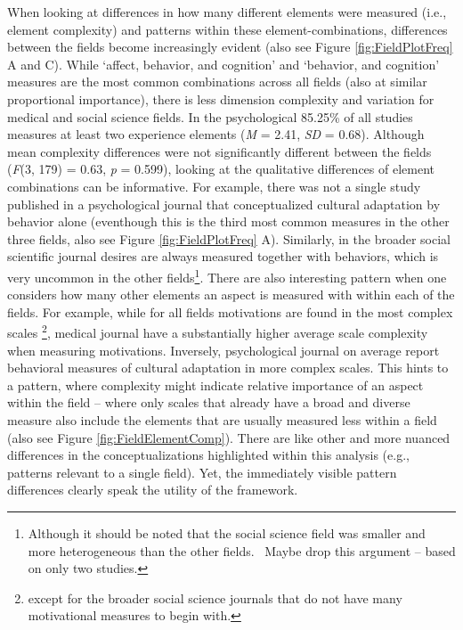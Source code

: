When looking at differences in how many different elements were measured
(i.e., element complexity) and patterns within these
element-combinations, differences between the fields become increasingly
evident (also see Figure \ref{fig:FieldPlotFreq} A and C). While
`affect, behavior, and cognition' and `behavior, and cognition' measures
are the most common combinations across all fields (also at similar
proportional importance), there is less dimension complexity and
variation for medical and social science fields. In the psychological
85.25\% of all studies measures at least two experience elements
(\textit{M} = 2.41, \textit{SD} = 0.68). Although mean complexity
differences were not significantly different between the fields
(\textit{F}(3, 179) = 0.63, \textit{p} = 0.599), looking at the
qualitative differences of element combinations can be informative. For
example, there was not a single study published in a psychological
journal that conceptualized cultural adaptation by behavior alone
(eventhough this is the third most common measures in the other three
fields, also see Figure \ref{fig:FieldPlotFreq} A). Similarly, in the
broader social scientific journal desires are always measured together
with behaviors, which is very uncommon in the other
fields\footnote{Although it should be noted that the social science field was smaller and more heterogeneous than the other fields. \Warning\ Maybe drop this argument -- based on only two studies.}.
There are also interesting pattern when one considers how many other
elements an aspect is measured with within each of the fields. For
example, while for all fields motivations are found in the most complex
scales
\footnote{except for the broader social science journals that do not have many motivational measures to begin with.},
medical journal have a substantially higher average scale complexity
when measuring motivations. Inversely, psychological journal on average
report behavioral measures of cultural adaptation in more complex
scales. This hints to a pattern, where complexity might indicate
relative importance of an aspect within the field -- where only scales
that already have a broad and diverse measure also include the elements
that are usually measured less within a field (also see Figure
\ref{fig:FieldElementComp}). There are like other and more nuanced
differences in the conceptualizations highlighted within this analysis
(e.g., patterns relevant to a single field). Yet, the immediately
visible pattern differences clearly speak the utility of the framework.

